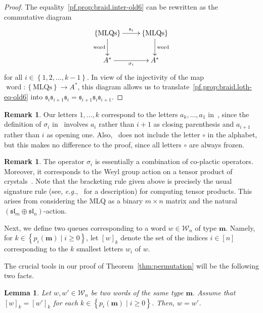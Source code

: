 \documentclass[reqno]{amsart}
\newcommand{\0}{\phantom{c}}
\newcommand{\mm}{\mathbf{m}}
\newcommand{\mcW}{\mathcal{W}}
\newcommand{\fraks}{\mathfrak{s}}
\newenvironment{verlong}{}{}
\newcommand{\word}{\operatorname{word}}
\newcommand{\set}[1]{\left\{ #1 \right\}}
\newcommand{\ive}[1]{\left[ #1 \right]}
\theoremstyle{plain}
\newtheorem{lemma}[thm]{Lemma}
\theoremstyle{definition}
\newtheorem{remark}[thm]{Remark}
\numberwithin{equation}{section}
\begin{document}
\begin{verlong}
\begin{proof}
The equality~\eqref{pf.prop:braid.inter-old6} can be rewritten as the
commutative diagram
\[
\xymatrix{
 \set{\text{MLQs}} \ar[r]^{\fraks_i} \ar[d]_{\word} & \set{\text{MLQs}} \ar[d]^{\word} \\
 A^* \ar[r]_{\sigma_i} & A^*
}
\]
for all $i \in \set{1, 2, \dotsc, k-1}$.
In view of the injectivity of the map $\word \colon \set{\text{MLQs}} \to A^*$,
this diagram allows us to translate~\eqref{pf.prop:braid.loth-eq-old6} into
$\fraks_i \fraks_{i+1} \fraks_i = \fraks_{i+1} \fraks_i \fraks_{i+1}$.
\end{proof}

\begin{remark}
Our letters $1, \ldots, k$ correspond to the letters
$a_k, \ldots, a_1$ in~\cite{Loth},
since the definition of $\sigma_i$ in~\cite{Loth} involves $a_i$ rather
than $i+1$ as closing parenthesis and $a_{i+1}$ rather than $i$ as opening one.
Also,~\cite{Loth} does not include the letter $\circ$ in the alphabet,
but this makes no difference to the proof, since all letters $\circ$ are always frozen.
\end{remark}

\begin{remark}
The operator $\sigma_i$ is essentially a combination of co-plactic operators.
Moreover, it corresponds to the Weyl group action on a tensor product of crystals~\cite{BS17}.
Note that the bracketing rule given above is precisely the usual signature rule (see, \textit{e.g.},~\cite[Sec.~2.4]{BS17} for a description) for computing tensor products.
This arises from considering the MLQ as a binary $m \times n$ matrix and the natural $(\mathfrak{sl}_m \oplus \mathfrak{sl}_n)$-action.
\end{remark}

Next, we define two queues corresponding to a word $w \in \mcW_n$ of type $\mm$.
Namely, for $k \in \set{p_i(\mm) \mid i \geq 0}$, let $[w]_k$ denote the set of the indices $i \in \ive{n}$
corresponding to the $k$ smallest letters $w_i$ of $w$.

The crucial tools in our proof of Theorem~\ref{thm:permutation} will be the following two facts.

\begin{lemma} \label{lem:SL.reconstruct-old6}
Let $w, w' \in \mcW_n$ be two words of the same type $\mm$.
Assume that $[w]_k = [w']_k$ for each $k \in \set{p_i(\mm) \mid i \geq 0}$.
Then, $w = w'$.
\end{lemma}


\end{verlong}
\end{document}
